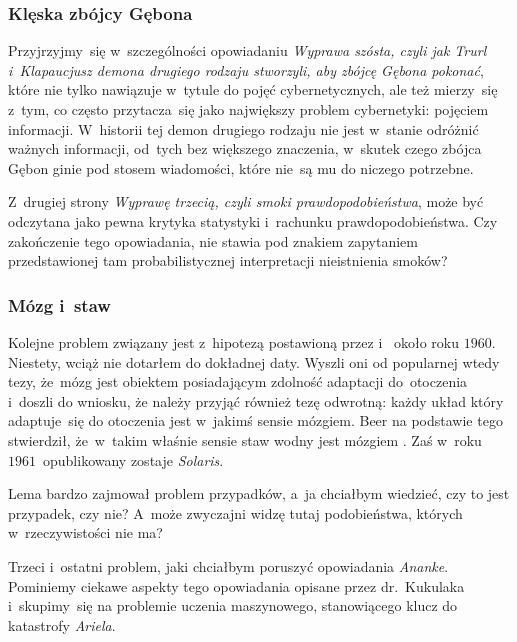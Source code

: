 \documentclass[10pt,t]{beamer}
\begin{document}
\begin{frame}
  \frametitle{Klęska zbójcy Gębona}


  Przyjrzyjmy~się w~szczególności opowiadaniu \textit{Wyprawa szósta, czyli
    jak Trurl i~Klapaucjusz demona drugiego rodzaju stworzyli, aby zbójcę
    Gębona pokonać}, które nie tylko nawiązuje w~tytule do pojęć
  cybernetycznych, ale też mierzy~się z~tym, co często przytacza~się jako
  największy problem cybernetyki: pojęciem informacji. W~historii tej demon
  drugiego rodzaju nie jest w~stanie odróżnić ważnych informacji, od~tych
  bez większego znaczenia, w~skutek czego zbójca Gębon ginie pod stosem
  wiadomości, które nie~są mu do niczego potrzebne.

  Z~drugiej strony \textit{Wyprawę trzecią, czyli smoki
    prawdopodobieństwa}, może być odczytana jako pewna krytyka statystyki
  i~rachunku prawdopodobieństwa. Czy zakończenie tego opowiadania, nie
  stawia pod znakiem zapytaniem przedstawionej tam probabilistycznej
  interpretacji nieistnienia smoków?

\end{frame}





\begin{frame}
  \frametitle{Mózg i~staw}


  Kolejne problem związany jest z~hipotezą postawioną przez
  i~
  około roku $1960$. Niestety, wciąż nie dotarłem do dokładnej daty.
  Wyszli oni od popularnej wtedy tezy, że~mózg jest obiektem posiadającym
  zdolność adaptacji do~otoczenia i~doszli do wniosku, że należy przyjąć
  również tezę odwrotną: każdy układ który adaptuje~się do otoczenia jest
  w~jakimś sensie mózgiem. Beer na podstawie tego stwierdził, że~w~takim
  właśnie sensie staw wodny jest mózgiem
  \parencite{Pickering-Cybernetics-in-Britain-Ver-2022}. Zaś w~roku
  $1961$~opublikowany zostaje \textit{Solaris}.

  Lema bardzo zajmował problem przypadków, a~ja chciałbym wiedzieć, czy to
  jest przypadek, czy nie? A~może zwyczajni widzę tutaj podobieństwa,
  których w~rzeczywistości nie ma?

  Trzeci i~ostatni problem, jaki chciałbym poruszyć opowiadania
  \textit{Ananke}. Pominiemy ciekawe aspekty tego opowiadania opisane
  przez dr.~Kukulaka i~skupimy~się na problemie uczenia maszynowego,
  stanowiącego klucz do katastrofy \textit{Ariela}.

\end{frame}
\end{document}
